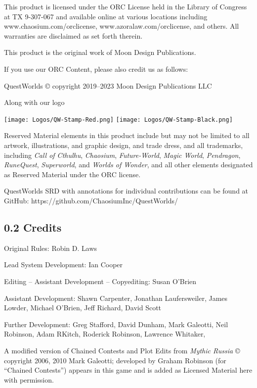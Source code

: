 \documentclass[
  11pt,
]{article}
\begin{document}
This product is licensed under the ORC License held in the Library of
Congress at TX 9-307-067 and available online at various locations
including www.chaosium.com/orclicense, www.azoralaw.com/orclicense, and
others. All warranties are disclaimed as set forth therein.

This product is the original work of Moon Design Publications.

If you use our ORC Content, please also credit us as follows:

QuestWorlds © copyright 2019--2023 Moon Design Publications LLC

Along with our logo

\texttt{[image: Logos/QW-Stamp-Red.png]}
\texttt{[image: Logos/QW-Stamp-Black.png]}

Reserved Material elements in this product include but may not be
limited to all artwork, illustrations, and graphic design, and trade
dress, and all trademarks, including \emph{Call of Cthulhu},
\emph{Chaosium}, \emph{Future-World}, \emph{Magic World},
\emph{Pendragon}, \emph{RuneQuest}, \emph{Superworld}, and \emph{Worlds
of Wonder}, and all other elements designated as Reserved Material under
the ORC license.

QuestWorlds SRD with annotations for individual contributions can be
found at GitHub: https://github.com/ChaosiumInc/QuestWorlds/

\hypertarget{credits}{%
\subsection{0.2 Credits}\label{credits}}

Original Rules: Robin D. Laws

Lead System Development: Ian Cooper

Editing -- Assistant Development -- Copyediting: Susan O'Brien

Assistant Development: Shawn Carpenter, Jonathan Laufersweiler, James
Lowder, Michael O'Brien, Jeff Richard, David Scott

Further Development: Greg Stafford, David Dunham, Mark Galeotti, Neil
Robinson, Adam RKitch, Roderick Robinson, Lawrence Whitaker,

A modified version of Chained Contests and Plot Edits from \emph{Mythic
Russia} © copyright 2006, 2010 Mark Galeotti; developed by Graham
Robinson (for ``Chained Contests'') appears in this game and is added as
Licensed Material here with permission.
\end{document}
